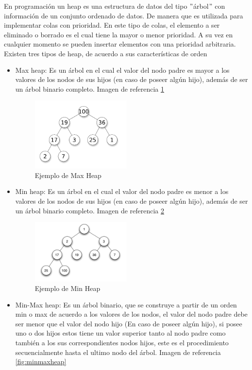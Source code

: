 En programación un heap es una estructura de datos del tipo $"$árbol$"$ con información de un conjunto ordenado de datos. De manera que es utilizada para implementar colas con prioridad. En este tipo de colas, el elemento a ser eliminado o borrado es el cual tiene la mayor o menor prioridad. A su vez en cualquier momento se pueden insertar elementos con una prioridad arbitraria. 	
\\
Existen tres tipos de heap, de acuerdo a sus características de orden
\begin{itemize}
	\item Max heap: Es un árbol en el cual el valor del nodo padre es mayor a los valores de los nodos de sus hijos (en caso de poseer algún hijo), además de ser un árbol binario completo. Imagen de referencia \ref{fig:maxheap}\begin{figure}[hbtp]
	\centering
	\includegraphics[width=5cm]{fig/Max-Heap.png}
	\caption{\label{fig:maxheap} Ejemplo de Max Heap}
\end{figure} 
	\item Min heap: Es un árbol en el cual el valor del nodo padre es menor a los valores de los nodos de sus hijos (en caso de poseer algún hijo), además de ser un árbol binario completo. Imagen de referencia \ref{fig:minheap}
\begin{figure}[hbtp]
	\centering
	\includegraphics[width=5cm]{fig/Min-heap.png}
	\caption{\label{fig:minheap} Ejemplo de Min Heap}
\end{figure} 	  
	\item Min-Max heap: Es un árbol binario, que se construye a partir de un orden min  o max de acuerdo a los valores de los nodos, el valor del nodo padre debe ser menor que el valor del nodo hijo (En caso de poseer algún hijo), si posee uno o dos hijos estos tiene un valor superior tanto al nodo padre como también a los sus correspondientes nodos hijos, este es el procedimiento secuencialmente hasta el ultimo nodo del árbol. Imagen de referencia \ref{fig:minmaxheap}

\end{itemize}
